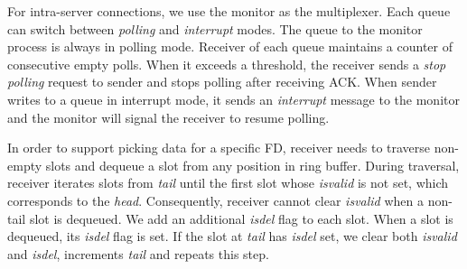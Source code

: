 For intra-server connections, we use the monitor as the multiplexer. Each queue can switch between \textit{polling} and \textit{interrupt} modes. The queue to the monitor process is always in polling mode. Receiver of each queue maintains a counter of consecutive empty polls. When it exceeds a threshold, the receiver sends a \textit{stop polling} request to sender and stops polling after receiving ACK. When sender writes to a queue in interrupt mode, it sends an \textit{interrupt} message to the monitor and the monitor will signal the receiver to resume polling. 

In order to support picking data for a specific FD, receiver needs to traverse non-empty slots and dequeue a slot from any position in ring buffer. During traversal, receiver iterates slots from \textit{tail} until the first slot whose \textit{isvalid} is not set, which corresponds to the \textit{head}. Consequently, receiver cannot clear \textit{isvalid} when a non-tail slot is dequeued. We add an additional \textit{isdel} flag to each slot. When a slot is dequeued, its \textit{isdel} flag is set. If the slot at \textit{tail} has \textit{isdel} set, we clear both \textit{isvalid} and \textit{isdel}, increments \textit{tail} and repeats this step.







